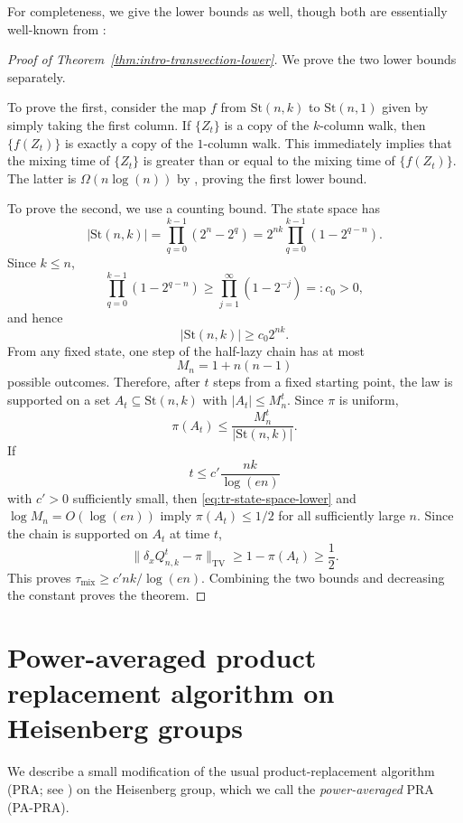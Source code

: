 \documentclass[11pt, reqno]{amsart}
\numberwithin{equation}{section}
\newcommand{\Stief}[2]{\mathrm{St}(#1,#2)}
\begin{document}
For completeness, we give the lower bounds as well, though both are essentially well-known from \cite{BenHamou2025,BenHamouPeres2018,PeresTanakaZhai2020}:

\begin{proof}[Proof of Theorem~\ref{thm:intro-transvection-lower}]
We prove the two lower bounds separately.

To prove the first, consider the map $f$ from $\Stief{n}{k}$ to $\Stief{n}{1}$ given by simply taking the first column. If $\{Z_{t}\}$ is a copy of the $k$-column walk, then $\{f(Z_{t})\}$ is exactly a copy of the $1$-column walk. This immediately implies that the mixing time of $\{Z_{t}\}$ is greater than or equal to the mixing time of $\{f(Z_{t})\}$. The latter is $\Omega(n \log(n))$ by \cite{BenHamouPeres2018}, proving the first lower bound.

To prove the second, we use a counting bound.  The state space has
\[
    |\Stief{n}{k}|=\prod_{q=0}^{k-1}(2^n-2^q)
    =2^{nk}\prod_{q=0}^{k-1}(1-2^{q-n}).
\]
Since \(k\le n\),
\[
    \prod_{q=0}^{k-1}(1-2^{q-n})
    \ge \prod_{j=1}^{\infty}(1-2^{-j})=:c_0>0,
\]
and hence
\begin{equation}\label{eq:tr-state-space-lower}
    |\Stief{n}{k}|\ge c_0 2^{nk}.
\end{equation}
From any fixed state, one step of the half-lazy chain has at most
\[
    M_n=1+n(n-1)
\]
possible outcomes.  Therefore, after \(t\) steps from a fixed starting point,
the law is supported on a set \(A_t\subseteq\Stief{n}{k}\) with
\(|A_t|\le M_n^t\).  Since \(\pi\) is uniform,
\[
    \pi(A_t)\le \frac{M_n^t}{|\Stief{n}{k}|}.
\]
If
\[
    t\le c'\frac{nk}{\log(e n)}
\]
with \(c'>0\) sufficiently small, then \eqref{eq:tr-state-space-lower} and
\(\log M_n=O(\log(e n))\) imply \(\pi(A_t)\le1/2\) for all sufficiently large
\(n\).  Since the chain is supported on \(A_t\) at time \(t\),
\[
    \|\delta_xQ_{n,k}^t-\pi\|_{\mathrm{TV}}
    \ge 1-\pi(A_t)\ge \frac12.
\]
This proves
\(\tau_{\mathrm{mix}}\ge c'nk/\log(e n)\).  Combining the two bounds and
decreasing the constant proves the theorem.
\end{proof}


\section{Power-averaged product replacement algorithm on Heisenberg groups}\label{sec:heis}

We describe a small modification of the usual product-replacement algorithm (PRA; see \cite{CellerLeedhamGreenMurrayNiemeyerOBrien1995,Pak2001}) on the Heisenberg group, which we call the \textit{power-averaged} PRA (PA-PRA). 
\end{document}

